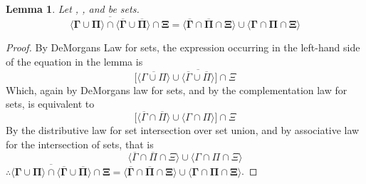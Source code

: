 \documentclass[preview]{standalone}
\newtheorem{lemma}{Lemma}
\begin{document}
\begin{lemma} %
    Let \bm{$\Gamma$}, \bm{$\Pi$}, and \bm{$\Xi$} be sets.
    \begin{equation*}
        \bm{
            \overline{
                \Big \langle \Gamma \cup \Pi \Big \rangle
                    \cap
                \Big \langle \overline{\Gamma} \cup \overline{\Pi} \Big \rangle
            }
                \cap
            \Xi
                    =
            \Big \langle \overline{\Gamma} \cap \overline{\Pi} \cap \Xi \Big \rangle
                \cup
            \Big \langle \Gamma \cap \Pi \cap \Xi \Big \rangle
        }
    \end{equation*}
\end{lemma}
\begin{proof}
    By DeMorgans Law for sets, 
    the expression occurring in the left-hand side of the equation in the lemma is
    \begin{equation*}
        \bigg[
            \Big \langle \overline{\Gamma \cup \Pi} \Big \rangle
                \cup
            \Big \langle \overline{\overline{\Gamma} \cup \overline{\Pi}} \Big \rangle
        \bigg]
            \cap
        \Xi
    \end{equation*}
    Which, again by DeMorgans law for sets, and by the complementation law for sets, is equivalent to
    \begin{equation*}
        \bigg[
            \Big \langle \overline{\Gamma} \cap \overline{\Pi} \Big \rangle
                \cup
            \Big \langle \Gamma \cap \Pi \Big \rangle
        \bigg]
            \cap
        \Xi
    \end{equation*}
    By the distributive law for set intersection over set union,
    and by associative law for the intersection of sets, that is
    \begin{equation*}
        \Big \langle \overline{\Gamma} \cap \overline{\Pi} \cap \Xi \Big \rangle
            \cup
        \Big \langle \Gamma \cap \Pi \cap \Xi \Big \rangle
    \end{equation*}
    $\therefore \bm{
        \overline{
            \big \langle \Gamma \cup \Pi \big \rangle
                \cap
            \big \langle \overline{\Gamma} \cup \overline{\Pi} \big \rangle
        }
            \cap
        \Xi
            =
        \big \langle \overline{\Gamma} \cap \overline{\Pi} \cap \Xi \big \rangle
            \cup
        \big \langle \Gamma \cap \Pi \cap \Xi \big \rangle
    }$.
\end{proof}
\end{document}
